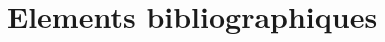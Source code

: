 \documentclass[12 pt]{article}
\begin{document}
\section{Elements bibliographiques}

\cite{Shiva} 

\end{document}
